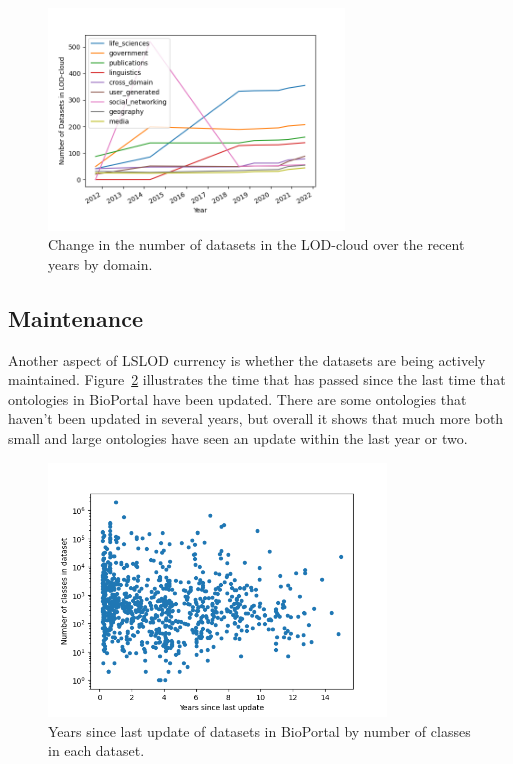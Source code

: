 \documentclass[runningheads]{llncs}
\begin{document}
    \begin{figure}[ht]
        \centering
        \includegraphics[width=0.7\textwidth]{figures/lod-cloud-change}
        \caption{Change in the number of datasets in the LOD-cloud over the recent years by domain.}
        \label{fig:lod-cloud-change}
    \end{figure}

    \subsection{Maintenance}
    Another aspect of LSLOD currency is whether the datasets are being actively maintained.
    Figure~\ref{fig:bioportal-maintenance} illustrates the time that has passed since the last time that ontologies in BioPortal have been updated.
    There are some ontologies that haven't been updated in several years, but overall it shows that much more both small and large ontologies have seen an update within the last year or two.

    \begin{figure}[ht]
        \centering
        \includegraphics[width=0.8\textwidth]{figures/bio-portal-maintenance}
        \caption{Years since last update of datasets in BioPortal by number of classes in each dataset.}
        \label{fig:bioportal-maintenance}
    \end{figure}
\end{document}
